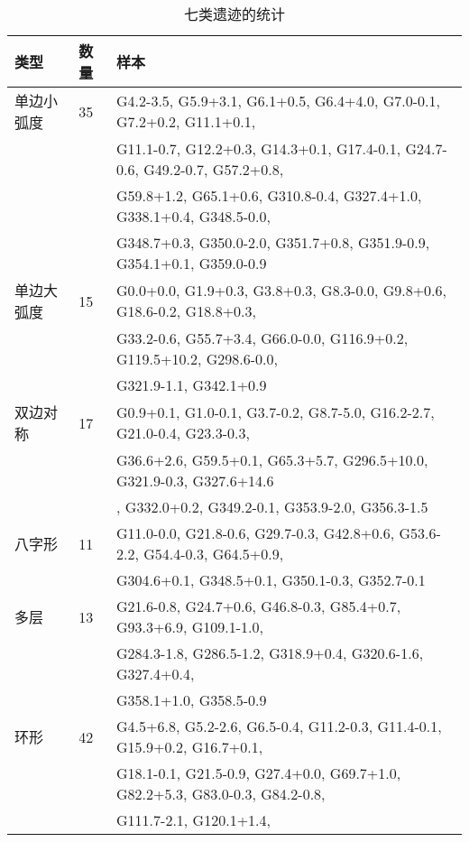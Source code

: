 \begin{table*}
  \caption{七类遗迹的统计}
  \label{table:stat}
  \centering
  \begin{tabular}{l l l}
      \hline\hline
      类型                           & 数量           & 样本               \\
      \hline
      单边小弧度         & 35                &G4.2-3.5, G5.9+3.1, G6.1+0.5, G6.4+4.0, G7.0-0.1, G7.2+0.2,
      G11.1+0.1, \\& & G11.1-0.7, G12.2+0.3,  G14.3+0.1, G17.4-0.1, G24.7-0.6, G49.2-0.7, G57.2+0.8,\\& & G59.8+1.2, G65.1+0.6,
      G310.8-0.4, G327.4+1.0, G338.1+0.4, G348.5-0.0, \\& & G348.7+0.3, G350.0-2.0, G351.7+0.8, G351.9-0.9,  G354.1+0.1,
      G359.0-0.9\\
      \hline
      单边大弧度         & 15                &G0.0+0.0, G1.9+0.3, G3.8+0.3, G8.3-0.0, G9.8+0.6, G18.6-0.2,
      G18.8+0.3, \\& & G33.2-0.6,  G55.7+3.4, G66.0-0.0, G116.9+0.2, G119.5+10.2, G298.6-0.0,\\& &  G321.9-1.1, G342.1+0.9\\
      \hline
      双边对称             & 17                &G0.9+0.1, G1.0-0.1, G3.7-0.2, G8.7-5.0, G16.2-2.7, G21.0-0.4,
      G23.3-0.3, \\& & G36.6+2.6,  G59.5+0.1,  G65.3+5.7, G296.5+10.0, G321.9-0.3, G327.6+14.6\\& &, G332.0+0.2, G349.2-0.1,
      G353.9-2.0, G356.3-1.5\\
      \hline
      八字形            & 11                &G11.0-0.0, G21.8-0.6, G29.7-0.3, G42.8+0.6, G53.6-2.2, G54.4-0.3,
      G64.5+0.9,  \\& & G304.6+0.1, G348.5+0.1, G350.1-0.3, G352.7-0.1\\
      \hline
      多层                     & 13                &G21.6-0.8, G24.7+0.6, G46.8-0.3, G85.4+0.7, G93.3+6.9, G109.1-1.0,
      \\& & G284.3-1.8,  G286.5-1.2,  G318.9+0.4, G320.6-1.6, G327.4+0.4,\\& & G358.1+1.0, G358.5-0.9\\
      \hline
      环形                        & 42                &G4.5+6.8, G5.2-2.6, G6.5-0.4, G11.2-0.3, G11.4-0.1, G15.9+0.2,
      G16.7+0.1,\\& & G18.1-0.1,  G21.5-0.9,  G27.4+0.0, G69.7+1.0, G82.2+5.3, G83.0-0.3, G84.2-0.8,\\& & G111.7-2.1, G120.1+1.4,

\end{tabular}
\end{table*}
